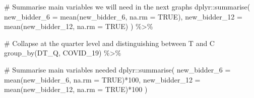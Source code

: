 \documentclass[
]{report}
\newenvironment{Shaded}{\begin{snugshade}}{\end{snugshade}}
\newcommand{\AttributeTok}[1]{\textcolor[rgb]{0.40,0.45,0.13}{#1}}
\newcommand{\CommentTok}[1]{\textcolor[rgb]{0.37,0.37,0.37}{#1}}
\newcommand{\ConstantTok}[1]{\textcolor[rgb]{0.56,0.35,0.01}{#1}}
\newcommand{\DecValTok}[1]{\textcolor[rgb]{0.68,0.00,0.00}{#1}}
\newcommand{\FunctionTok}[1]{\textcolor[rgb]{0.28,0.35,0.67}{#1}}
\newcommand{\NormalTok}[1]{\textcolor[rgb]{0.00,0.23,0.31}{#1}}
\newcommand{\SpecialCharTok}[1]{\textcolor[rgb]{0.37,0.37,0.37}{#1}}
\begin{document}
\begin{Shaded}
\begin{Highlighting}[]
  \CommentTok{\# Summarise main variables we will need in the next graphs}
\NormalTok{  dplyr}\SpecialCharTok{::}\FunctionTok{summarise}\NormalTok{(}
    \AttributeTok{new\_bidder\_6 =} \FunctionTok{mean}\NormalTok{(new\_bidder\_6, }\AttributeTok{na.rm =} \ConstantTok{TRUE}\NormalTok{),}
    \AttributeTok{new\_bidder\_12 =} \FunctionTok{mean}\NormalTok{(new\_bidder\_12, }\AttributeTok{na.rm =} \ConstantTok{TRUE}\NormalTok{)}
\NormalTok{  )   }\SpecialCharTok{\%\textgreater{}\%}

  \CommentTok{\# Collapse at the quarter level and distinguishing between T and C }
  \FunctionTok{group\_by}\NormalTok{(DT\_Q, COVID\_19) }\SpecialCharTok{\%\textgreater{}\%} 
  
  \CommentTok{\# Summarise main variables needed}
\NormalTok{  dplyr}\SpecialCharTok{::}\FunctionTok{summarise}\NormalTok{(}
    \AttributeTok{new\_bidder\_6 =} \FunctionTok{mean}\NormalTok{(new\_bidder\_6, }\AttributeTok{na.rm =} \ConstantTok{TRUE}\NormalTok{)}\SpecialCharTok{*}\DecValTok{100}\NormalTok{,}
    \AttributeTok{new\_bidder\_12 =} \FunctionTok{mean}\NormalTok{(new\_bidder\_12, }\AttributeTok{na.rm =} \ConstantTok{TRUE}\NormalTok{)}\SpecialCharTok{*}\DecValTok{100}
\NormalTok{  ) }
\end{Highlighting}
\end{Shaded}

\begin{figure}

\begin{minipage}[t]{\linewidth}

{\centering 


}

\end{minipage}%

\end{figure}

\begin{figure}

\begin{minipage}[t]{\linewidth}

{\centering 


}

\end{minipage}%

\end{figure}
\end{document}
